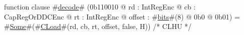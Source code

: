 function clause #\hyperref[zdecode]{decode}# (0b110010 @ rd : IntRegEnc @ cb : CapRegOrDDCEnc @ rt : IntRegEnc @ offset : #\hyperref[zbits]{bits}#(8) @ 0b0 @ 0b01) = #\hyperref[zSome]{Some}#(#\hyperref[zCLoad]{CLoad}#(rd, cb, rt, offset, false, H)) /* CLHU */

